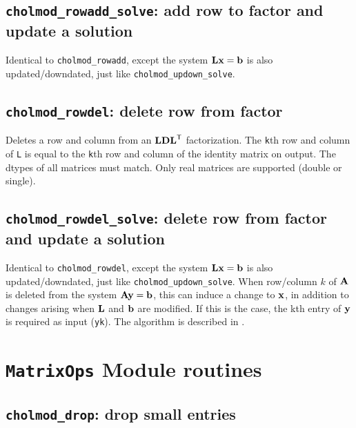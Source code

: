 \documentclass[11pt]{article}
\newcommand{\m}[1]{{\bf{#1}}}       %
\newcommand{\tr}{^{\sf T}}          %
\begin{document}
\subsection{{\tt cholmod\_rowadd\_solve}: add row to factor and update a
solution}


Identical to {\tt cholmod\_rowadd}, except the system $\m{Lx}=\m{b}$ is also
updated/downdated, just like {\tt cholmod\_updown\_solve}.

\subsection{{\tt cholmod\_rowdel}: delete row from factor}


Deletes a row and column from an $\m{LDL}\tr$ factorization.  The {\tt k}th row
and column of {\tt L} is equal to the {\tt k}th row and column of the identity
matrix on output.  The dtypes of all matrices must match.  Only real matrices
are supported (double or single).

\subsection{{\tt cholmod\_rowdel\_solve}: delete row from factor and update a solution}


Identical to {\tt cholmod\_rowdel}, except the system $\m{Lx}=\m{b}$ is also
updated/downdated, just like {\tt cholmod\_updown\_solve}.  When row/column $k$
of $\m{A}$ is deleted from the system $\m{Ay}=\m{b}$, this can induce a change
to $\m{x}$, in addition to changes arising when $\m{L}$ and $\m{b}$ are
modified.  If this is the case, the kth entry of $\m{y}$ is required as input
({\tt yk}).  The algorithm is described in \cite{DavisHager05}.

\newpage \section{{\tt MatrixOps} Module routines}

\subsection{{\tt cholmod\_drop}: drop small entries}
\end{document}
